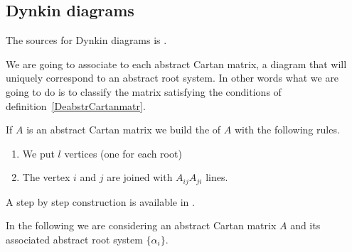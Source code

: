 \subsection{Dynkin diagrams}
\label{SubsecDynkindiam}

The sources for Dynkin diagrams is \cite{SternLieAlgebra,Wisser}.

We are going to associate to each abstract Cartan matrix, a diagram that will uniquely correspond to an abstract root system. In other words what we are going to do is to classify the matrix satisfying the conditions of definition~\ref{DeabstrCartanmatr}.

If \( A\) is an abstract Cartan matrix we build the  of \( A\) with the following rules.
\begin{enumerate}
    \item
        We put \( l\) vertices (one for each root)
    \item
        The vertex \( i\) and \( j\) are joined with \( A_{ij}A_{ji}\) lines.
\end{enumerate}
A step by step construction is available in \cite{Wisser}.

In the following we are considering an abstract Cartan matrix \( A\) and its associated abstract root system \( \{ \alpha_i \}\).

